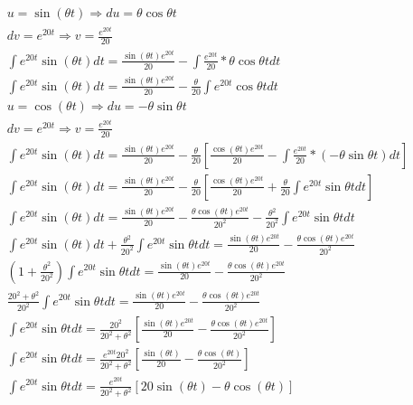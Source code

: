 \documentclass{abntex2}
\begin{document}
\begin{eqnarray*}
    u = \sin{(\theta t)} \Rightarrow du = \theta\cos{\theta t}\\
    dv = e^{20t} \Rightarrow v = \frac{e^{20t}}{20}\\
    {\int}e^{20t}\sin{(\theta t)}dt = \frac{\sin{(\theta t)}e^{20t}}{20} - {\int}\frac{e^{20t}}{20}*\theta\cos{\theta t}dt\\
    {\int}e^{20t}\sin{(\theta t)}dt =   \frac{\sin{(\theta t)}e^{20t}}{20} - \frac{\theta}{20}{\int}e^{20t}\cos{\theta t}dt\\
    u = \cos{(\theta t)} \Rightarrow du = -\theta\sin{\theta t}\\
    dv = e^{20t} \Rightarrow v = \frac{e^{20t}}{20}\\
    {\int}e^{20t}\sin{(\theta t)}dt = \frac{\sin{(\theta t)}e^{20t}}{20} - \frac{\theta}{20}\left[\frac{\cos{(\theta t)}e^{20t}}{20} - {\int}\frac{e^{20t}}{20}*(-\theta\sin{\theta t})dt\right]\\
    {\int}e^{20t}\sin{(\theta t)}dt = \frac{\sin{(\theta t)}e^{20t}}{20} - \frac{\theta}{20}\left[\frac{\cos{(\theta t)}e^{20t}}{20} + \frac{\theta}{20}{\int}e^{20t}\sin{\theta t}dt\right]\\
    {\int}e^{20t}\sin{(\theta t)}dt = \frac{\sin{(\theta t)}e^{20t}}{20} - \frac{\theta\cos{(\theta t)}e^{20t}}{20^2} - \frac{\theta^2}{20^2}{\int}e^{20t}\sin{\theta t}dt\\
    {\int}e^{20t}\sin{(\theta t)}dt+ \frac{\theta^2}{20^2}{\int}e^{20t}\sin{\theta t}dt= \frac{\sin{(\theta t)}e^{20t}}{20} - \frac{\theta\cos{(\theta t)}e^{20t}}{20^2}\\
    (1 + \frac{\theta^2}{20^2}){\int}e^{20t}\sin{\theta t}dt= \frac{\sin{(\theta t)}e^{20t}}{20} - \frac{\theta\cos{(\theta t)}e^{20t}}{20^2}\\
    \frac{20^2 +\theta^2}{20^2}{\int}e^{20t}\sin{\theta t}dt= \frac{\sin{(\theta t)}e^{20t}}{20} - \frac{\theta\cos{(\theta t)}e^{20t}}{20^2}\\
    {\int}e^{20t}\sin{\theta t}dt= \frac{20^2}{20^2 +\theta^2}\left[\frac{\sin{(\theta t)}e^{20t}}{20} - \frac{\theta\cos{(\theta t)}e^{20t}}{20^2}\right]\\
    {\int}e^{20t}\sin{\theta t}dt= \frac{e^{20t}20^2}{20^2 +\theta^2}\left[\frac{\sin{(\theta t)}}{20} - \frac{\theta\cos{(\theta t)}}{20^2}\right]\\
    {\int}e^{20t}\sin{\theta t}dt= \frac{e^{20t}}{20^2 +\theta^2}\left[20\sin{(\theta t)} - \theta\cos{(\theta t)}\right]\\
\end{eqnarray*}
\end{document}
